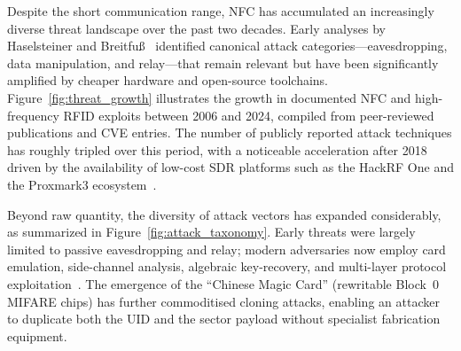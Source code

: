 \documentclass[sigconf]{acmart}
\begin{document}
Despite the short communication range, NFC has accumulated an increasingly diverse threat landscape over the past two decades. Early analyses by Haselsteiner and Breitfu\ss{}~\cite{haselsteiner2006nfc} identified canonical attack categories---eavesdropping, data manipulation, and relay---that remain relevant but have been significantly amplified by cheaper hardware and open-source toolchains. Figure~\ref{fig:threat_growth} illustrates the growth in documented NFC and high-frequency RFID exploits between 2006 and 2024, compiled from peer-reviewed publications and CVE entries. The number of publicly reported attack techniques has roughly tripled over this period, with a noticeable acceleration after 2018 driven by the availability of low-cost SDR platforms such as the HackRF One and the Proxmark3 ecosystem~\cite{iceman}.

\begin{center}
\label{fig:threat_growth}
\end{center}

Beyond raw quantity, the diversity of attack vectors has expanded considerably, as summarized in Figure~\ref{fig:attack_taxonomy}. Early threats were largely limited to passive eavesdropping and relay; modern adversaries now employ card emulation, side-channel analysis, algebraic key-recovery, and multi-layer protocol exploitation~\cite{kasper2012all}. The emergence of the ``Chinese Magic Card'' (rewritable Block~0 MIFARE chips) has further commoditised cloning attacks, enabling an attacker to duplicate both the UID and the sector payload without specialist fabrication equipment.
\end{document}
